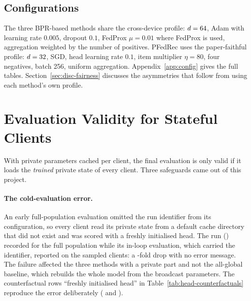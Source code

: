 \begin{table}[htbp]
  \caption{The cited runs. $^{\dagger}$Wall-clock time from the run identifier to the result
  timestamp on one RTX 5090 (includes the final full-population evaluation).}
  \label{tab:runs}
  \centering\small
  \fittable{}
\end{table}

\subsection{Configurations}
\label{sec:setup-config}

The three BPR-based methods share the cross-device profile: $d=64$, Adam with learning rate
$0.005$, dropout $0.1$, FedProx $\mu=0.01$ where FedProx is used, aggregation weighted by the
number of positives. PFedRec uses the paper-faithful profile: $d=32$, SGD, head
learning rate $0.1$, item multiplier $\eta=80$, four negatives, batch 256, uniform aggregation.
Appendix~\ref{app:config} gives the full tables. Section~\ref{sec:disc-fairness} discusses the
asymmetries that follow from using each method's own profile.

\section{Evaluation Validity for Stateful Clients}
\label{sec:setup-validity}

With private parameters cached per client, the final evaluation is only valid if it loads the
\emph{trained} private state of every client. Three safeguards came out of this project.

\paragraph{The cold-evaluation error.} An early full-population evaluation omitted the run
identifier from its configuration, so every client read its private state from a default cache
directory that did not exist and was scored with a freshly initialised head. The run
(\RunPfedrecColdShort) recorded \ColdEvalNdcg{} \ndcg{} for the full population while its
in-loop evaluation, which carried the identifier, reported \ColdEvalInLoopNdcg{} on the sampled
clients: a \ColdEvalRatio-fold drop with no error message. The failure affected the three
methods with a private part and not the all-global baseline, which rebuilds the whole model
from the broadcast parameters. The counterfactual rows ``freshly initialised head'' in
Table~\ref{tab:head-counterfactuals} reproduce the error deliberately
(\NdcgHeadRandom{} and \NdcgHeadGlobalHeadCold).


